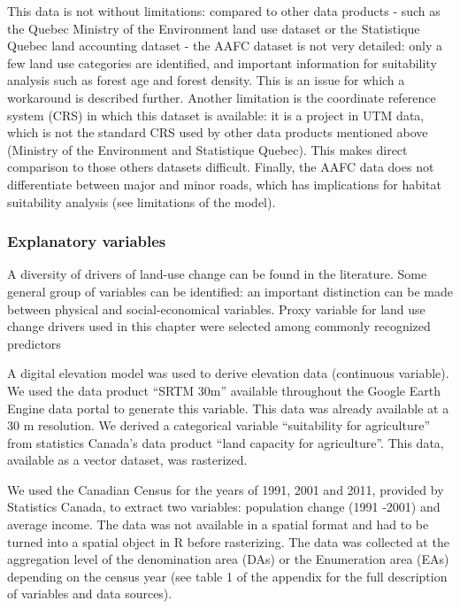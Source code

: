 This data is not without limitations: compared to other data products - such as the Quebec Ministry of the Environment land use dataset or the Statistique Quebec land accounting dataset - the AAFC dataset is not very detailed: only a few land use categories are identified, and important information for suitability analysis such as forest age and forest density. This is an issue for which a workaround is described further.  Another limitation is the coordinate reference system (CRS) in which this dataset is available: it is a project in UTM data, which is not the standard CRS used by other data products mentioned above (Ministry of the Environment and Statistique Quebec). This makes direct comparison to those others datasets difficult. Finally, the AAFC data does not differentiate between major and minor roads, which has implications for habitat suitability analysis (see limitations of the model).\\

\subsubsection*{Explanatory variables}
A diversity of drivers of land-use change can be found in the literature. Some general group of variables can be identified: an important distinction can be made between physical and social-economical variables. Proxy variable for land use change drivers used in this chapter were selected among commonly recognized predictors

A digital elevation model was used to derive elevation data (continuous variable). We used the data product “SRTM 30m” available throughout the Google Earth Engine data portal to generate this variable. This data was already available at a 30 m resolution. We derived a categorical variable “suitability for agriculture” from statistics Canada’s data product “land capacity for agriculture”. This data, available as a vector dataset, was rasterized.

We used the Canadian Census for the years of 1991, 2001 and 2011, provided by Statistics Canada, to extract two variables: population change (1991 -2001) and average income. The data was not available in a spatial format and had to be turned into a spatial object in R before rasterizing. The data was collected at the aggregation level of the denomination area (DAs) or the Enumeration area (EAs) depending on the census year (see table 1 of the appendix for the full description of variables and data sources).\\

